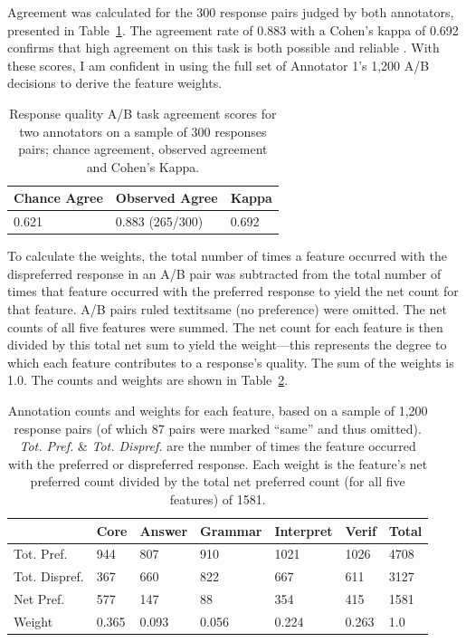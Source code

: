 Agreement was calculated for the 300 response pairs judged by both annotators, presented in Table~\ref{tab:ABAgreement}. The agreement rate of 0.883 with a Cohen's kappa of 0.692 confirms that high agreement on this task is both possible and reliable \citep{landis1977measurement, artstein:massimo:2008}. With these scores, I am confident in using the full set of Annotator 1's 1,200 A/B decisions to derive the feature weights.

\begin{table}[htb!]
\begin{center}
\begin{tabular}{|l|l|l|}
\hline
 Chance Agree & Observed Agree & Kappa \\
\hline
0.621 & 0.883 (265/300) & 0.692 \\
\hline
\end{tabular}
\caption{\label{tab:ABAgreement} Response quality A/B task agreement scores for two annotators on a sample of 300 responses pairs; chance agreement, observed agreement and Cohen's Kappa.}
\end{center}
\end{table}

To calculate the weights, the total number of times a feature occurred with the dispreferred response in an A/B pair was subtracted from the total number of times that feature occurred with the preferred response to yield the net count for that feature. A/B pairs ruled textit{same} (no preference) were omitted. The net counts of all five features were summed. The net count for each feature is then divided by this total net sum to yield the weight---this represents the degree to which each feature contributes to a response's quality. The sum of the weights is 1.0. The counts and weights are shown in Table~\ref{tab:feature-weights}.

\begin{table}[htb!]
\begin{center}
\begin{tabular}{|l|l|l|l|l|l|l|}
\hline
	& Core	& Answer & Grammar & Interpret & Verif & Total \\
\hline
\hline
Tot. Pref. & 944 & 807 & 910 & 1021 & 1026 & 4708 \\
\hline
Tot. Dispref. & 367 & 660 & 822 & 667 & 611 & 3127 \\
\hline
Net Pref. & 577 & 147 & 88 & 354 & 415 & 1581 \\ 
\hline
Weight & 0.365 & 0.093 & 0.056 & 0.224 & 0.263 & 1.0 \\
\hline
\end{tabular}
\caption{\label{tab:feature-weights} Annotation counts and weights for each feature, based on a sample of 1,200 response pairs (of which 87 pairs were marked ``same'' and thus omitted). \textit{Tot. Pref.} \& \textit{Tot. Dispref.} are the number of times the feature occurred with the preferred or dispreferred response. Each weight is the feature's net preferred count divided by the total net preferred count (for all five features) of 1581.}
\end{center}
\end{table}

